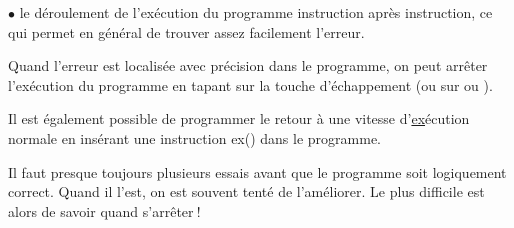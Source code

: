 {\begin{list}{$\scriptscriptstyle\bullet$}{
\renewcommand{\rightmargin}{0mm}
}
le déroulement de l'exécution du programme instruction après
instruction, ce qui permet en général de trouver assez facilement l'erreur.
\enlargethispage{2\baselineskip}%
\item Quand l'erreur est localisée avec précision dans le programme, on
 peut arrêter l'exécution du programme en tapant sur
 la touche d'é\-chap\-pe\-ment  (ou sur \touche{\S} ou \touche{\#}).
\item[]  Il est également possible de programmer le retour à une vitesse
   d'\underline{ex}é\-cu\-tion normale en insérant une instruction {\idt ex()}
  dans le programme.
\end{list}
}
Il faut presque toujours plusieurs essais avant que le programme soit 
lo\-gi\-que\-ment correct.
Quand il l'est, on est souvent tenté de l'améliorer. Le plus difficile
est alors de savoir quand \hbox{s'arrêter$\:$!}

